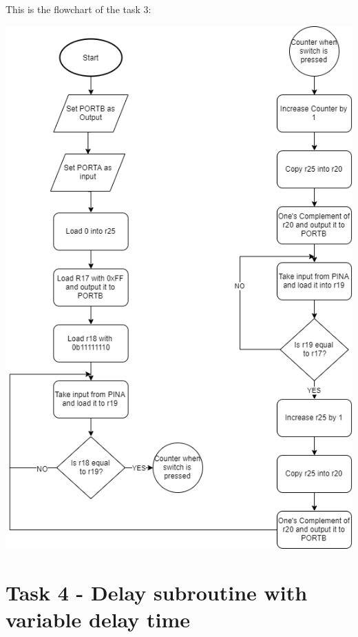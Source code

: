 \documentclass[a4paper,12pt]{article}
\begin{document}
\newpage
This is the flowchart of the task 3:
\begin{center}
\includegraphics[scale=0.8]{img/Task3.png}
\end{center}

\newpage
\section{Task 4 - Delay subroutine with variable delay time}
\end{document}
